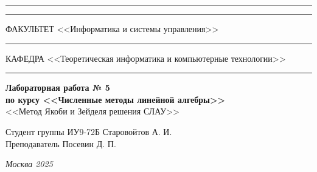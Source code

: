\documentclass[a4paper, 14pt]{extarticle}
\begin{document}
\begin{titlepage}
\vspace{-25pt}
\hspace{-35pt}\rule{\textwidth}{2.3pt}

\vspace*{-20.3pt}
\hspace{-35pt}\rule{\textwidth}{0.4pt}

\vspace{1.5ex}
\hspace{-35pt} \noindent \small ФАКУЛЬТЕТ\hspace{80pt} <<Информатика и системы управления>>

\vspace*{-16pt}
\hspace{47pt}\rule{0.83\textwidth}{0.4pt}

\vspace{0.5ex}
\hspace{-35pt} \noindent \small КАФЕДРА\hspace{50pt} <<Теоретическая информатика и компьютерные технологии>>

\vspace*{-16pt}
\hspace{30pt}\rule{0.866\textwidth}{0.4pt}

\vspace{11em}

\begin{center}
\Large {\bf Лабораторная работа № 5} \\
\large {\bf по курсу <<Численные методы линейной алгебры>>} \\
\large <<Метод Якоби и Зейделя решения СЛАУ>>
\end{center}\normalsize

\vspace{8em}


\begin{flushright}
  {Студент группы ИУ9-72Б Старовойтов А. И. \hspace*{15pt}\\
  \vspace{2ex}
  Преподаватель Посевин Д. П.\hspace*{15pt}}
\end{flushright}

\bigskip

\vfill


\begin{center}
\textsl{Москва 2025}
\end{center}
\end{titlepage}
\end{document}
